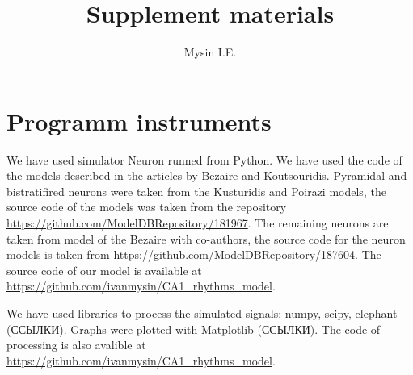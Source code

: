 \documentclass[a4paper,12pt]{article}
\title{Supplement materials}
\author{Mysin I.E.}
\date{}
\begin{document}
\maketitle

\section{Programm instruments}
We have used simulator Neuron runned from Python. We have used the code of the models described in the articles by Bezaire and Koutsouridis. Pyramidal and bistratifired neurons were taken from the Kusturidis and Poirazi models, the source code of the models was taken from the repository \url{https://github.com/ModelDBRepository/181967}. The remaining neurons are taken from model of the Bezaire  with co-authors, the source code for the neuron models is taken from \url{https://github.com/ModelDBRepository/187604}. The source code of our model is available at \url{https://github.com/ivanmysin/CA1\_rhythms\_model}. \par
We have used libraries to process the simulated signals: numpy, scipy, elephant (ССЫЛКИ). Graphs were plotted with Matplotlib (ССЫЛКИ). The code of processing is also avalible at \url{https://github.com/ivanmysin/CA1\_rhythms\_model}.
\end{document}
